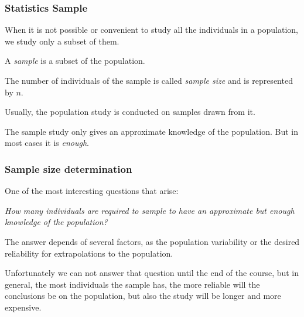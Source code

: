 \begin{frame}
\frametitle{Statistics Sample}
When it is not possible or convenient to study all the individuals in a population, we study only a subset of them.

\begin{definition}[Sample]
A \emph{sample} is a subset of the population.
\end{definition}

\begin{definition}
The number of individuals of the sample is called \emph{sample size} and is represented by $n$.
\end{definition}

Usually, the population study is conducted on samples drawn from it.

The sample study only gives an approximate knowledge of the population.
But in most cases it is \emph{enough}.
\end{frame}


\begin{frame}
\frametitle{Sample size determination}
One of the most interesting questions that arise:
\begin{center}
\alert{\emph{How many individuals are required to sample to have an approximate but enough knowledge of the population?}}
\end{center}

The answer depends of several factors, as the population variability or the desired reliability for extrapolations to the population.

Unfortunately we can not answer that question until the end of the course, but in general, the most individuals the sample has, the more reliable will the conclusions be on the population, but also the study will be longer and more expensive.
\end{frame}




